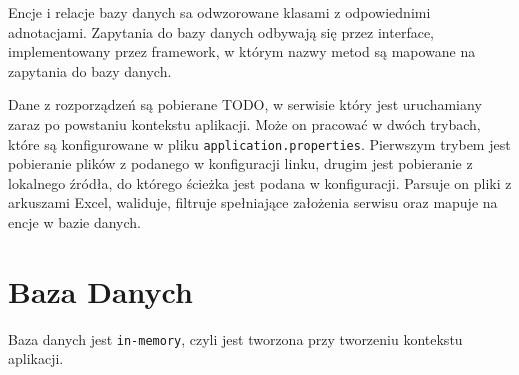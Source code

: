 \documentclass{article}
\begin{document}
    Encje i relacje bazy danych sa odwzorowane klasami z odpowiednimi adnotacjami.
    Zapytania do bazy danych odbywają się przez interface, implementowany przez framework,
    w którym nazwy metod są mapowane na zapytania do bazy danych.

    Dane z rozporządzeń są pobierane TODO, w serwisie który jest uruchamiany zaraz po powstaniu kontekstu aplikacji.
    Może on pracować w dwóch trybach, które są konfigurowane w pliku \texttt{application.properties}.
    Pierwszym trybem jest pobieranie plików z podanego w konfiguracji linku,
    drugim jest pobieranie z lokalnego źródła, do którego ścieżka jest podana w konfiguracji.
    Parsuje on pliki z arkuszami Excel, waliduje, filtruje spełniające założenia serwisu oraz mapuje na encje w bazie danych.
  \section{Baza Danych}
  Baza danych jest \texttt{in-memory}, czyli jest tworzona przy tworzeniu kontekstu aplikacji.
\end{document}
